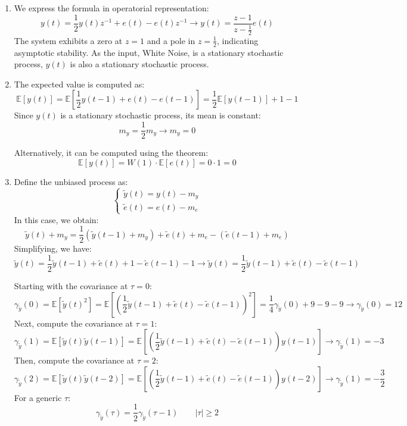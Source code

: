 \begin{enumerate}
    \item We express the formula in operatorial representation:
        \[y(t)=\dfrac{1}{2}y(t)z^{-1}+e(t)-e(t)z^{-1}\rightarrow y(t)=\dfrac{z-1}{z-\frac{1}{2}}e(t)\]
        The system exhibits a zero at $z=1$ and a pole in $z=\frac{1}{2}$, indicating asymptotic stability.
        As the input, White Noise, is a stationary stochastic process, $y(t)$ is also a stationary stochastic process.
    \item The expected value is computed as:
        \[\mathbb{E}\left[ y(t) \right]=\mathbb{E}\left[ \dfrac{1}{2}y(t-1)+e(t)-e(t-1) \right]=\dfrac{1}{2}\mathbb{E}\left[ y(t-1)\right] + 1 - 1\]
        Since $y(t)$ is a stationary stochastic process, its mean is constant:
        \[m_y=\dfrac{1}{2}m_y \rightarrow m_y=0\]

        Alternatively, it can be computed using the theorem: 
        \[\mathbb{E}\left[ y(t) \right]=W(1)\cdot\mathbb{E}\left[ e(t) \right]=0\cdot 1=0\]
    \item Define the unbiased process as: 
        \[\begin{cases}
            \tilde{y}(t)=y(t)-m_y \\
            \tilde{e}(t)=e(t)-m_e
        \end{cases}\]
        In this case, we obtain: 
        \[\tilde{y}(t)+m_y=\dfrac{1}{2}\left(\tilde{y}(t-1)+m_y\right)+\tilde{e}(t)+m_e-\left(\tilde{e}(t-1)+m_e\right)\]
        Simplifying, we have: 
        \[\tilde{y}(t)=\dfrac{1}{2}\tilde{y}(t-1)+\tilde{e}(t)+1-\tilde{e}(t-1)-1\rightarrow\tilde{y}(t)=\dfrac{1}{2}\tilde{y}(t-1)+\tilde{e}(t)-\tilde{e}(t-1)\]

        Starting with the covariance at $\tau=0$: 
        \[\gamma_{\tilde{y}}(0)=\mathbb{E}\left[\tilde{y}{(t)}^2\right]=\mathbb{E}\left[ {\left(\dfrac{1}{2}\tilde{y}(t-1)+\tilde{e}(t)-\tilde{e}(t-1)\right)}^2\right]=\dfrac{1}{4}\gamma_{\tilde{y}}(0) +9-9 - 9\rightarrow \gamma_{\tilde{y}}(0)=12\]
        Next, compute the covariance at $\tau=1$: 
        \[\gamma_{\tilde{y}}(1)=\mathbb{E}\left[ \tilde{y}(t)\tilde{y}(t-1)\right]=\mathbb{E}\left[ \left(\dfrac{1}{2}\tilde{y}(t-1)+\tilde{e}(t)-\tilde{e}(t-1)\right)y(t-1)\right]\rightarrow \gamma_{\tilde{y}}(1)=-3\]
        Then, compute the covariance at $\tau=2$: 
        \[\gamma_{\tilde{y}}(2)=\mathbb{E}\left[ \tilde{y}(t)\tilde{y}(t-2)\right]=\mathbb{E}\left[ \left(\dfrac{1}{2}\tilde{y}(t-1)+\tilde{e}(t)-\tilde{e}(t-1)\right)y(t-2)\right]\rightarrow \gamma_{\tilde{y}}(1)=-\dfrac{3}{2}\]
        For a generic $\tau$: 
        \[\gamma_{\tilde{y}}(\tau)=\dfrac{1}{2}\gamma_{\tilde{y}}(\tau-1) \qquad \left\lvert \tau \right\rvert \geq 2\]
\end{enumerate}